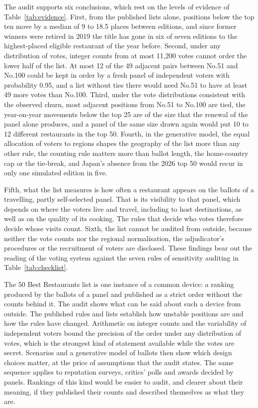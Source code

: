 \documentclass[11pt,a4paper]{article}
\begin{document}
The audit supports six conclusions, which rest on the levels of evidence of Table~\ref{tab:evidence}. First, from the published lists alone, positions below the top ten move by a median of 9 to 18.5 places between editions, and since former winners were retired in 2019 the title has gone in six of seven editions to the highest-placed eligible restaurant of the year before. Second, under any distribution of votes, integer counts from at most 11,200 votes cannot order the lower half of the list. At most 12 of the 49 adjacent pairs between No.51 and No.100 could be kept in order by a fresh panel of independent voters with probability 0.95, and a list without ties there would need No.51 to have at least 49 more votes than No.100. Third, under the vote distributions consistent with the observed churn, most adjacent positions from No.51 to No.100 are tied, the year-on-year movements below the top 25 are of the size that the renewal of the panel alone produces, and a panel of the same size drawn again would put 10 to 12 different restaurants in the top 50. Fourth, in the generative model, the equal allocation of voters to regions shapes the geography of the list more than any other rule, the counting rule matters more than ballot length, the home-country cap or the tie-break, and Japan's absence from the 2026 top 50 would recur in only one simulated edition in five.

Fifth, what the list measures is how often a restaurant appears on the ballots of a travelling, partly self-selected panel. That is its visibility to that panel, which depends on where the voters live and travel, including to host destinations, as well as on the quality of its cooking. The rules that decide who votes therefore decide whose visits count. Sixth, the list cannot be audited from outside, because neither the vote counts nor the regional normalisation, the adjudicator's procedures or the recruitment of voters are disclosed. These findings bear out the reading of the voting system against the seven rules of sensitivity auditing in Table~\ref{tab:checklist}.

The 50 Best Restaurants list is one instance of a common device: a ranking produced by the ballots of a panel and published as a strict order without the counts behind it. The audit shows what can be said about such a device from outside. The published rules and lists establish how unstable positions are and how the rules have changed. Arithmetic on integer counts and the variability of independent voters bound the precision of the order under any distribution of votes, which is the strongest kind of statement available while the votes are secret. Scenarios and a generative model of ballots then show which design choices matter, at the price of assumptions that the audit states. The same sequence applies to reputation surveys, critics' polls and awards decided by panels. Rankings of this kind would be easier to audit, and clearer about their meaning, if they published their counts and described themselves as what they are.
\end{document}
